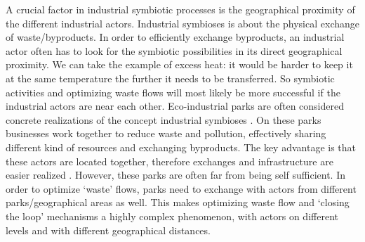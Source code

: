 \documentclass[fleqn,10pt]{wlscirep}
\begin{document}
A crucial factor in industrial symbiotic processes is the geographical proximity of the different industrial actors. Industrial symbioses is about the physical exchange of waste/byproducts. In order to efficiently exchange byproducts, an industrial actor often has to look for the symbiotic possibilities in its direct geographical proximity. We can take the example of excess heat: it would be harder to keep it at the same temperature the further it needs to be transferred. So symbiotic activities and optimizing waste flows will most likely be more successful if the industrial actors are near each other. Eco-industrial parks are often considered concrete realizations of the concept industrial symbioses . On these parks businesses work together to reduce waste and pollution, effectively sharing different kind of resources and exchanging byproducts. The key advantage is that these actors are located together, therefore exchanges and infrastructure are easier realized . However, these parks are often far from being self sufficient. In order to optimize `waste' flows, parks need to exchange with actors from different parks/geographical areas as well. This makes optimizing waste flow and `closing the loop' mechanisms a highly complex phenomenon, with actors on different levels and with different geographical distances. 
\end{document}
